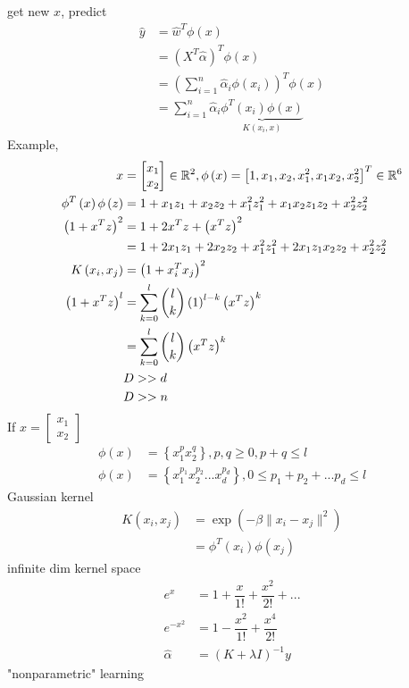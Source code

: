 \documentclass{article}
\begin{document}
get new $x $, predict
\begin{align*}
\hat{y} &= \hat{w}^{T} \phi\left(x\right)
\\ &= \left(X^{T} \hat{\alpha}\right)^{T} \phi\left(x \right)
\\ &= \left(\displaystyle\sum_{i=1}^{n} \hat{\alpha}_{i} \phi\left(x_{i}\right)\right)^{T} \phi\left(x \right)
\\ &= \displaystyle\sum_{i=1}^{n} \hat{\alpha}_{i} \underbrace{\phi^{T}\left(x_{i}\right) \phi\left(x \right)}_{K\left(x_{i}, x\right)}
\end{align*}
Example,
\begin{align*}
x  &= \begin{bmatrix} x_{1} \\ x_{2} \end{bmatrix} \in \mathbb{R}^{2} , \phi\left(x\right) = \left[1, x_{1}, x_{2}, x_{1}^{2}, x_{1} x_{2}, x_{2}^{2}\right]^{T} \in \mathbb{R}^{6}
\\ \phi^{T}\left(x\right) \phi\left(z\right) &= 1 + x_{1} z_{1} + x_{2} z_{2} + x_{1}^{2} z_{1}^{2} + x_{1} x_{2} z_{1} z_{2} + x_{2}^{2} z_{2}^{2}
\\ \left(1 + x^{T} z\right)^{2} &= 1 + 2 x^{T} z + \left(x^{T} z\right)^{2}
\\ &= 1+ 2 x_{1} z_{1} + 2 x_{2} z_{2} + x_{1}^{2} z_{1}^{2} + 2 x_{1} z_{1} x_{2} z_{2} + x_{2}^{2} z_{2}^{2}
\\ K\left(x_{i}, x_{j}\right)  &= \left(1 + x_{i}^{T} x_{j}\right)^{2}
\\ \left(1 + x^{T} z\right)^{l} &= \displaystyle\sum_{k=0}^{l} \dbinom{l}{k} \left(1\right)^{l-k} \left(x^{T} z\right)^{k}
\\ &= \displaystyle\sum_{k=0}^{l} \dbinom{l}{k} \left(x^{T} z\right)^{k}
\\ &  D  >> d 
\\ &  D  >> n 
\end{align*}
If $x  = \begin{bmatrix} x_{1} \\ x_{2} \end{bmatrix}$
\begin{align*}
\phi\left(x\right) &= \left\{x_{1}^{p} x_{2}^{q}\right\}, p, q \geq  0, p + q \leq  l 
\\ \phi\left(x\right) &= \left\{x_{1}^{p_{1}} x_{2}^{p_{2}} ... x_{d}^{p_{d}}\right\}, 0 \leq  p_{1} + p_{2} + ... p_{d} \leq  l 
\end{align*}
Gaussian kernel
\begin{align*}
K\left(x_{i}, x_{j}\right)  &= \exp\left(- \beta \| x_{i} - x_{j} \|^{2}\right)
\\ &= \phi^{T}\left(x_{i}\right) \phi\left(x_{j}\right)
\end{align*}
infinite dim kernel space
\begin{align*}
e^{x} &= 1 + \dfrac{x}{1!} + \dfrac{x^{2}}{2!} + ...
\\ e^{-x^{2}} &= 1 - \dfrac{x^{2}}{1!} + \dfrac{x^{4}}{2!}
\\ \hat{\alpha} &= \left(K + \lambda I\right)^{-1} y 
\end{align*}
"nonparametric" learning
\end{document}
